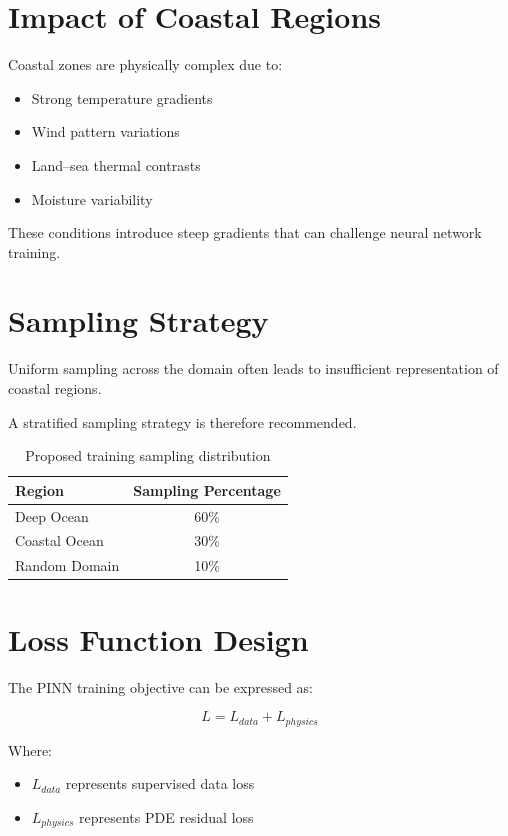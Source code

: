 \documentclass[12pt,a4paper]{article}
\begin{document}
\section{Impact of Coastal Regions}

Coastal zones are physically complex due to:

\begin{itemize}
\item Strong temperature gradients
\item Wind pattern variations
\item Land–sea thermal contrasts
\item Moisture variability
\end{itemize}

These conditions introduce steep gradients that can challenge neural network training.

\section{Sampling Strategy}

Uniform sampling across the domain often leads to insufficient representation of coastal regions.

A stratified sampling strategy is therefore recommended.

\begin{table}[H]
\centering
\begin{tabular}{lc}
\toprule
Region & Sampling Percentage \\
\midrule
Deep Ocean & 60\% \\
Coastal Ocean & 30\% \\
Random Domain & 10\% \\
\bottomrule
\end{tabular}
\caption{Proposed training sampling distribution}
\end{table}

\section{Loss Function Design}

The PINN training objective can be expressed as:

\begin{equation}
L = L_{data} + L_{physics}
\end{equation}

Where:

\begin{itemize}
\item $L_{data}$ represents supervised data loss
\item $L_{physics}$ represents PDE residual loss
\end{itemize}
\end{document}
